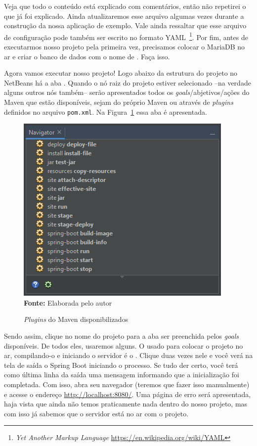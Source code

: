 Veja que todo o conteúdo está explicado com comentários, então não repetirei o que já foi explicado. Ainda atualizaremos esse arquivo algumas vezes durante a construção da nossa aplicação de exemplo. Vale ainda ressaltar que esse arquivo de configuração pode também ser escrito no formato YAML~\footnote{\textit{Yet Another Markup Language} \url{https://en.wikipedia.org/wiki/YAML}}. Por fim, antes de executarmos nosso projeto pela primeira vez, precisamos colocar o MariaDB no ar e criar o banco de dados com o nome de . Faça isso.

Agora vamos executar nosso projeto! Logo abaixo da estrutura do projeto no NetBeans há a aba . Quando o nó raiz do projeto estiver selecionado --na verdade alguns outros nós também-- serão apresentados todos os \textit{goals}/abjetivos/ações do Maven que estão disponíveis, sejam do próprio Maven ou através de \textit{plugins} definidos no arquivo \texttt{pom.xml}. Na Figura~\ref{fig:cap10PluginsMaven} essa aba é apresentada.

\FloatBarrier
\begin{figure}[!htbp]
    \centering
    \caption{\textit{Plugins} do Maven disponibilizados}
    \includegraphics[scale=1]{imagens/cap10PluginsMaven}
    \\\textbf{Fonte:} Elaborada pelo autor
    \label{fig:cap10PluginsMaven}
\end{figure}
\FloatBarrier

Sendo assim, clique no nome do projeto para a aba  ser preenchida pelos \textit{goals} disponíveis. De todos eles, usaremos alguns. O usado para colocar o projeto no ar, compilando-o e iniciando o servidor é o . Clique duas vezes nele e você verá na tela de saída o Spring Boot iniciando o processo. Se tudo der certo, você terá como última linha da saída uma mensagem informando que a inicialização foi completada. Com isso, abra seu navegador (teremos que fazer isso manualmente) e acesse o endereço \url{http://localhost:8080/}. Uma página de erro será apresentada, haja vista que ainda não temos praticamente nada dentro do nosso projeto, mas com isso já sabemos que o servidor está no ar com o projeto.


